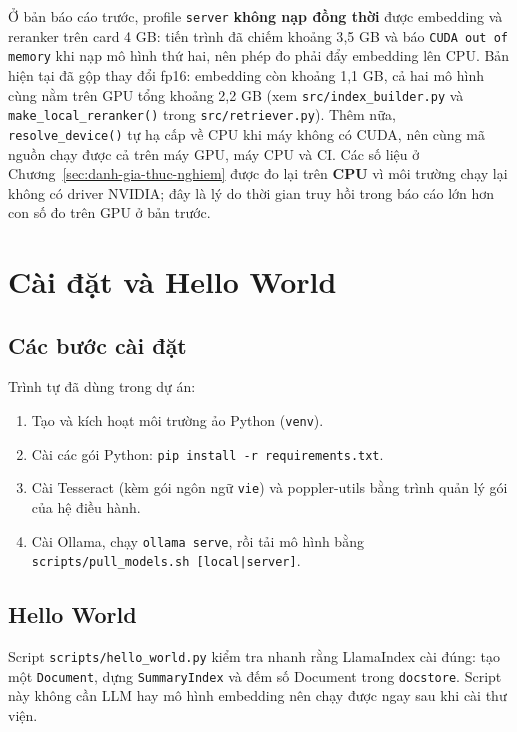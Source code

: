 Ở bản báo cáo trước, profile \texttt{server} \textbf{không nạp đồng thời} được embedding và reranker trên card 4 GB: tiến trình đã chiếm khoảng 3{,}5 GB và báo \texttt{CUDA out of memory} khi nạp mô hình thứ hai, nên phép đo phải đẩy embedding lên CPU. Bản hiện tại đã gộp thay đổi fp16: embedding còn khoảng 1{,}1 GB, cả hai mô hình cùng nằm trên GPU tổng khoảng 2{,}2 GB (xem \texttt{src/index\_builder.py} và \texttt{make\_local\_reranker()} trong \texttt{src/retriever.py}). Thêm nữa, \texttt{resolve\_device()} tự hạ cấp về CPU khi máy không có CUDA, nên cùng mã nguồn chạy được cả trên máy GPU, máy CPU và CI. Các số liệu ở Chương~\ref{sec:danh-gia-thuc-nghiem} được đo lại trên \textbf{CPU} vì môi trường chạy lại không có driver NVIDIA; đây là lý do thời gian truy hồi trong báo cáo lớn hơn con số đo trên GPU ở bản trước.

\section{Cài đặt và Hello World}

\subsection{Các bước cài đặt}

Trình tự đã dùng trong dự án:

\begin{enumerate}
  \item Tạo và kích hoạt môi trường ảo Python (\texttt{venv}).
  \item Cài các gói Python: \texttt{pip install -r requirements.txt}.
  \item Cài Tesseract (kèm gói ngôn ngữ \texttt{vie}) và poppler-utils bằng trình quản lý gói của hệ điều hành.
  \item Cài Ollama, chạy \texttt{ollama serve}, rồi tải mô hình bằng \texttt{scripts/pull\_models.sh [local|server]}.
\end{enumerate}

\subsection{Hello World}

Script \texttt{scripts/hello\_world.py} kiểm tra nhanh rằng LlamaIndex cài đúng: tạo một \texttt{Document}, dựng \texttt{SummaryIndex} và đếm số Document trong \texttt{docstore}. Script này không cần LLM hay mô hình embedding nên chạy được ngay sau khi cài thư viện.

